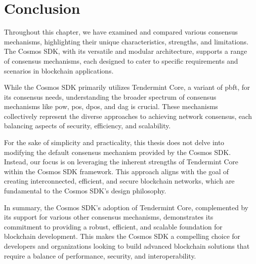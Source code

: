 \section{Conclusion}

Throughout this chapter, we have examined and compared various consensus mechanisms, highlighting their unique characteristics, strengths, and limitations. The Cosmos SDK, with its versatile and modular architecture, supports a range of consensus mechanisms, each designed to cater to specific requirements and scenarios in blockchain applications.

While the Cosmos SDK primarily utilizes Tendermint Core, a variant of \gls{pbft}, for its consensus needs, understanding the broader spectrum of consensus mechanisms like \gls{pow}, \gls{pos}, \gls{dpos}, and \gls{dag} is crucial. These mechanisms collectively represent the diverse approaches to achieving network consensus, each balancing aspects of security, efficiency, and scalability.

For the sake of simplicity and practicality, this thesis does not delve into modifying the default consensus mechanism provided by the Cosmos SDK. Instead, our focus is on leveraging the inherent strengths of Tendermint Core within the Cosmos SDK framework. This approach aligns with the goal of creating interconnected, efficient, and secure blockchain networks, which are fundamental to the Cosmos SDK's design philosophy.

In summary, the Cosmos SDK's adoption of Tendermint Core, complemented by its support for various other consensus mechanisms, demonstrates its commitment to providing a robust, efficient, and scalable foundation for blockchain development. This makes the Cosmos SDK a compelling choice for developers and organizations looking to build advanced blockchain solutions that require a balance of performance, security, and interoperability.

